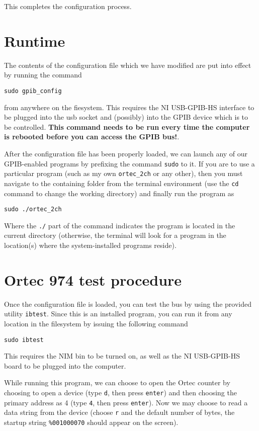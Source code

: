 \documentclass[letterpaper,11pt]{article}
\begin{document}
This completes the configuration process.

\section{Runtime}
The contents of the configuration file which we have modified are put into effect by running the command
\begin{verbatim}
sudo gpib_config
\end{verbatim}
from anywhere on the fiesystem. This requires the NI USB-GPIB-HS interface to be plugged into the usb socket and (possibly) into the GPIB device which is to be controlled. \textbf{This command needs to be run every time the computer is rebooted before you can access the GPIB bus!}.

After the configuration file has been properly loaded, we can launch any of our GPIB-enabled programs by prefixing the command \texttt{sudo} to it. If you are to use a particular program (such as my own \texttt{ortec\_2ch} or any other), then you must navigate to the containing folder from the terminal environment (use the \texttt{cd} command to change the working directory) and finally run the program as
\begin{verbatim}
sudo ./ortec_2ch
\end{verbatim}
Where the \texttt{./} part of the command indicates the program is located in the current directory (otherwise, the terminal will look for a program in the location(s) where the system-installed programs reside).

\section{Ortec 974 test procedure}
Once the configuration file is loaded, you can test the bus by using the provided utility \texttt{ibtest}. Since this is an installed program, you can run it from any location in the filesystem by issuing the following command
\begin{verbatim}
sudo ibtest
\end{verbatim}
This requires the NIM bin to be turned on, as well as the NI USB-GPIB-HS board to be plugged into the computer.

While running this program, we can choose to open the Ortec counter by choosing to open a device (type \texttt{d}, then press \texttt{enter}) and then choosing the primary address as 4 (type \texttt{4}, then press \texttt{enter}). Now we may choose to read a data string from the device (choose \texttt{r} and the default number of bytes, the startup string \texttt{\%001000070} should appear on the screen).
\end{document}
